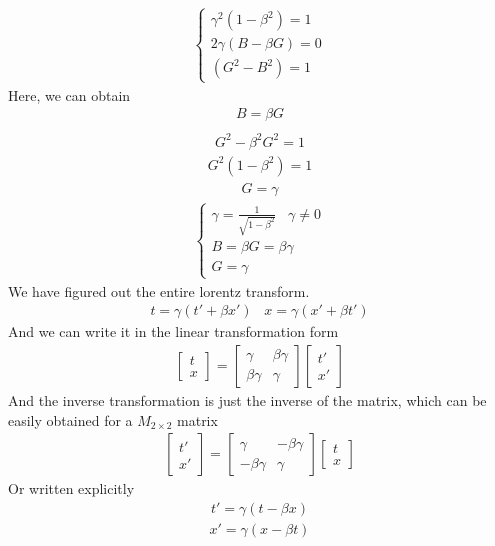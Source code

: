 \documentclass[12pt]{book}
\begin{document}
\begin{align}
\begin{cases}
    \gamma^2(1-\beta^2)=1\\
    2\gamma(B-\beta G)=0\\
    (G^2-B^2)=1
\end{cases}
\end{align}
Here, we can obtain
\begin{align}
B=\beta G\\
\end{align}
\begin{align}
G^2 - \beta ^2 G^2 = 1
\end{align}
\begin{align}
G^2(1-\beta ^2 ) = 1
\end{align}
\begin{align}
G = \gamma
\end{align}
\begin{align}
\begin{cases}
    \gamma = \frac{1}{\sqrt{1-\beta^2}} \;\;\; \gamma \neq 0\\
    B=\beta G = \beta \gamma \\ 
    G = \gamma
\end{cases}
\end{align}
We have figured out the entire lorentz transform.
\begin{align}
t = \gamma (t'+\beta x') \;\;\;
x = \gamma (x'+\beta t')
\end{align}
And we can write it in the linear transformation form
\begin{align}
\begin{bmatrix}
    t \\ x
\end{bmatrix}
=
\begin{bmatrix}
    \gamma      &   \beta\gamma   \\
    \beta\gamma &   \gamma
\end{bmatrix}
\begin{bmatrix}
    t'\\ x'
\end{bmatrix}
\end{align}
And the inverse transformation is just the inverse of the matrix, which can be easily obtained for a $M_{2 \times 2}$ matrix
\begin{align}
\begin{bmatrix}
    t' \\ x'
\end{bmatrix}
=
\begin{bmatrix}
    \gamma      &   -\beta\gamma   \\
    -\beta\gamma &   \gamma
\end{bmatrix}
\begin{bmatrix}
    t\\ x
\end{bmatrix}
\end{align}
Or written explicitly
\begin{align}
t' = \gamma(t-\beta x)
\end{align}
\begin{align}
x' = \gamma (x-\beta t)
\end{align}
\end{document}
